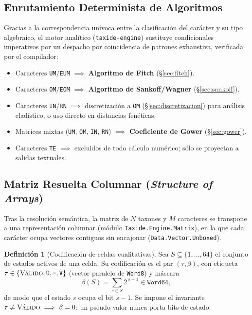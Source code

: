 \documentclass[11pt,a4paper]{article}
\theoremstyle{definition}
\newtheorem{definicion}{Definición}[section]
\theoremstyle{remark}
\begin{document}
\subsection{Enrutamiento Determinista de Algoritmos}
Gracias a la correspondencia unívoca entre la clasificación del carácter y su tipo algebraico, el motor analítico (\texttt{taxide-engine}) sustituye condicionales imperativos por un despacho por coincidencia de patrones exhaustiva, verificada por el compilador:
\begin{itemize}
    \item Caracteres \texttt{UM}/\texttt{EUM} $\implies$ \textbf{Algoritmo de Fitch} (\S\ref{sec:fitch}).
    \item Caracteres \texttt{OM}/\texttt{EOM} $\implies$ \textbf{Algoritmo de Sankoff/Wagner} (\S\ref{sec:sankoff}).
    \item Caracteres \texttt{IN}/\texttt{RN} $\implies$ discretización a \texttt{OM} (\S\ref{sec:discretizacion}) para análisis cladístico, o uso directo en distancias fenéticas.
    \item Matrices mixtas (\texttt{UM}, \texttt{OM}, \texttt{IN}, \texttt{RN}) $\implies$ \textbf{Coeficiente de Gower} (\S\ref{sec:gower}).
    \item Caracteres \texttt{TE} $\implies$ excluidos de todo cálculo numérico; sólo se proyectan a salidas textuales.
\end{itemize}

\subsection{Matriz Resuelta Columnar (\textit{Structure of Arrays})}
\label{sec:soa}
Tras la resolución semántica, la matriz de $N$ taxones y $M$ caracteres se transpone a una representación columnar (módulo \texttt{Taxide.Engine.Matrix}), en la que cada carácter ocupa vectores contiguos sin encajonar (\texttt{Data.Vector.Unboxed}).

\begin{definicion}[Codificación de celdas cualitativas]
Sea $S \subseteq \{1,\dots,64\}$ el conjunto de estados activos de una celda. Su codificación es el par $(\tau, \beta)$, con etiqueta $\tau \in \{\textsc{Válido}, \texttt{U}, \texttt{-}, \texttt{V}\}$ (vector paralelo de \texttt{Word8}) y máscara
\begin{equation}
\label{eq:bitset}
\beta(S) = \sum_{s \in S} 2^{\,s-1} \in \texttt{Word64},
\end{equation}
de modo que el estado $s$ ocupa el bit $s-1$. Se impone el invariante $\tau \neq \textsc{Válido} \implies \beta = 0$: un pseudo-valor nunca porta bits de estado.
\end{definicion}
\end{document}
